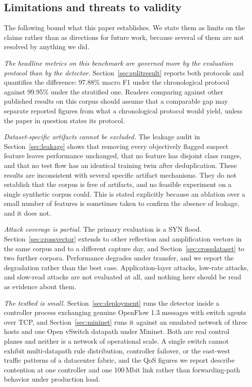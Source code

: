 \documentclass{ieeeaccess}
\begin{document}
\subsection{Limitations and threats to validity}
\label{sec:limitations}
The following bound what this paper establishes. We state them as limits on the claims rather than as directions for future work, because several of them are not resolved by anything we did.

\emph{The headline metrics on this benchmark are governed more by the evaluation protocol than by the detector.} Section~\ref{sec:splitresult} reports both protocols and quantifies the difference: 97.88\% macro F1 under the chronological protocol against 99.95\% under the stratified one. Readers comparing against other published results on this corpus should assume that a comparable gap may separate reported figures from what a chronological protocol would yield, unless the paper in question states its protocol.

\emph{Dataset-specific artifacts cannot be excluded.} The leakage audit in Section~\ref{sec:leakage} shows that removing every objectively flagged suspect feature leaves performance unchanged, that no feature has disjoint class ranges, and that no test flow has an identical training twin after deduplication. These results are inconsistent with several specific artifact mechanisms. They do not establish that the corpus is free of artifacts, and no feasible experiment on a single synthetic corpus could. This is stated explicitly because an ablation over a small number of features is sometimes taken to confirm the absence of leakage, and it does not.

\emph{Attack coverage is partial.} The primary evaluation is a SYN flood. Section~\ref{sec:crossvector} extends to other reflection and amplification vectors in the same corpus and to a different capture day, and Section~\ref{sec:crossdataset} to two further corpora. Performance degrades under transfer, and we report the degradation rather than the best case. Application-layer attacks, low-rate attacks, and slow-read attacks are not evaluated at all, and nothing here should be read as evidence about them.

\emph{The testbed is small.} Section~\ref{sec:deployment} runs the detector inside a controller process exchanging genuine OpenFlow 1.3 messages with switch agents over TCP, and Section~\ref{sec:mininet} runs it against an emulated network of three hosts and one Open vSwitch datapath under Mininet. Both are real control planes and neither is a network of operational scale. A single switch cannot exhibit multi-datapath rule distribution, controller failover, or the east-west traffic patterns of a datacenter fabric, and the QoS figures we report describe contention at one controller and one 100\,Mbit link rather than forwarding-path behavior under production load.
\end{document}
